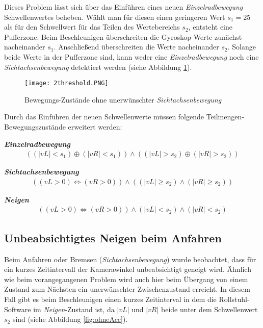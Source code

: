 Dieses Problem lässt sich über das Einführen eines neuen \textit{Einzelradbewegung} Schwellenwertes beheben.
Wählt man für diesen einen geringeren Wert $s_1 = 25$ als für den Schwellwert für das Teilen des Wertebereichs $s_2$, entsteht eine Pufferzone.
Beim Beschleunigen überschreiten die Gyroskop-Werte zunächst nacheinander $s_1$. Anschließend überschreiten die Werte nacheinander $s_2$.
Solange beide Werte in der Pufferzone sind, kann weder eine \textit{Einzelradbewegung} noch eine \textit{Sichtachsenbewegung} detektiert werden (siehe Abbildung \ref{fig:2_threshold}).

\begin{figure}[h]
    \centering
    \texttt{[image: 2threshold.PNG]}
    \caption{Bewegungs-Zustände ohne unerwünschter \textit{Sichtachsenbewegung}}
    \label{fig:2_threshold}
\end{figure}

Durch das Einführen der neuen Schwellenwerte müssen folgende Teilmengen-Bewegungszustände erweitert werden:

\textbf{\textit{Einzelradbewegung}}
\begin{align}
    ((|vL| < s_1) \oplus (|vR| < s_1)) \land ((|vL| > s_2) \oplus (|vR| > s_2))
\end{align}

\textbf{\textit{Sichtachsenbewegung}}
\begin{align}
    ((vL > 0) \Leftrightarrow (vR > 0)) \land ((|vL| \geq s_2) \land (|vR| \geq s_2))
\end{align}

\textbf{\textit{Neigen}}
\begin{align}
    ((vL > 0) \Leftrightarrow (vR > 0)) \land (|vL| < s_2) \land (|vR| < s_2)
\end{align}

\subsection{Unbeabsichtigtes Neigen beim Anfahren}
Beim Anfahren oder Bremsen (\textit{Sichtachsenbewegung}) wurde beobachtet, dass für ein kurzes Zeitintervall der Kamerawinkel unbeabsichtigt geneigt wird.
Ähnlich wie beim vorangegangenen Problem wird auch hier beim Übergang von einem Zustand zum Nächsten ein unerwünschter Zwischenzustand erreicht.
In diesem Fall gibt es beim Beschleunigen einen kurzes Zeitinterval in dem die Rollstuhl-Software im \textit{Neigen}-Zustand ist, da $|vL|$ und $|vR|$ beide unter dem Schwellenwert $s_2$ sind (siehe Abbildung \ref{fig:ohneAcc}).

